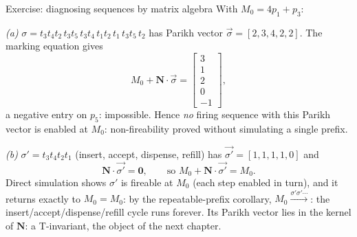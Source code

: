 \begin{examplebox}{Exercise: diagnosing sequences by matrix algebra}
With $M_0 = 4p_1 + p_3$:
\par\smallskip
\emph{(a)} $\sigma = t_3 t_4 t_2\, t_3 t_5\, t_3 t_4\, t_1 t_2\, t_1\, t_3 t_5\, t_2$ has Parikh vector $\vec{\sigma} = [2, 3, 4, 2, 2]$. The marking equation gives
\[
M_0 + \mathbf{N} \cdot \vec{\sigma} = \begin{bmatrix} 3 \\ 1 \\ 2 \\ 0 \\ \boxed{-1} \end{bmatrix},
\]
a negative entry on $p_5$: impossible. Hence \emph{no} firing sequence with this Parikh vector is enabled at $M_0$: non-fireability proved without simulating a single prefix.
\par\smallskip
\emph{(b)} $\sigma' = t_3 t_4 t_2 t_1$ (insert, accept, dispense, refill) has $\vec{\sigma'} = [1, 1, 1, 1, 0]$ and
\[
\mathbf{N} \cdot \vec{\sigma'} = \mathbf{0}, \qquad \text{so } M_0 + \mathbf{N} \cdot \vec{\sigma'} = M_0.
\]
Direct simulation shows $\sigma'$ is fireable at $M_0$ (each step enabled in turn), and it returns exactly to $M_0 = M_0$: by the repeatable-prefix corollary, $M_0 \xrightarrow{\sigma' \sigma' \cdots}$: the insert/accept/dispense/refill cycle runs forever. Its Parikh vector lies in the kernel of $\mathbf{N}$: a T-invariant, the object of the next chapter.
\end{examplebox}
